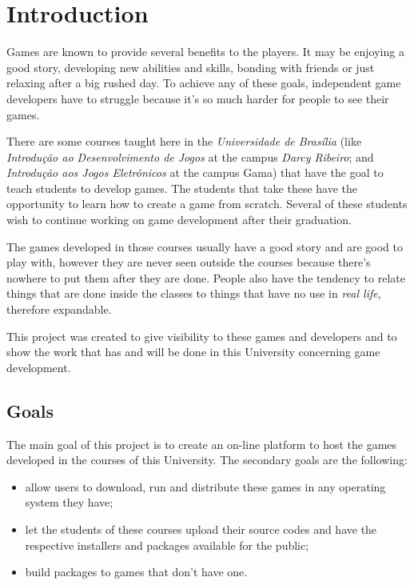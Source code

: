 \chapter*[Introduction]{Introduction}

Games are known to provide several benefits to the players. It may be enjoying a good story, developing new abilities and skills, bonding with friends or just relaxing after a big rushed day. To achieve any of these goals, independent game developers have to struggle because it's so much harder for people to see their games.

There are some courses taught here in the \textit{Universidade de Bras\'ilia} (like \textit{Introdução ao Desenvolvimento de Jogos} at the campus \textit{Darcy Ribeiro}; and \textit{Introdução aos Jogos Eletrônicos} at the campus Gama) that have the goal to teach students to develop games. The students that take these have the opportunity to learn how to create a game from scratch. Several of these students wish to continue working on game development after their graduation.

The games developed in those courses usually have a good story and are good to play with, however they are never seen outside the courses because there's nowhere to put them after they are done. People also have the tendency to relate things that are done inside the classes to things that have no use in \textit{real life}, therefore expandable.

This project was created to give visibility to these games and developers and to show the work that has and will be done in this University concerning game development.

\section*{Goals}

The main goal of this project is to create an on-line platform to host the games developed in the courses of this University. The secondary goals are the following:

\begin{itemize}
\item allow users to download, run and distribute these games in any operating system they have;
\item let the students of these courses upload their source codes and have the respective installers and packages available for the public;
\item build packages to games that don't have one.
\end{itemize}

